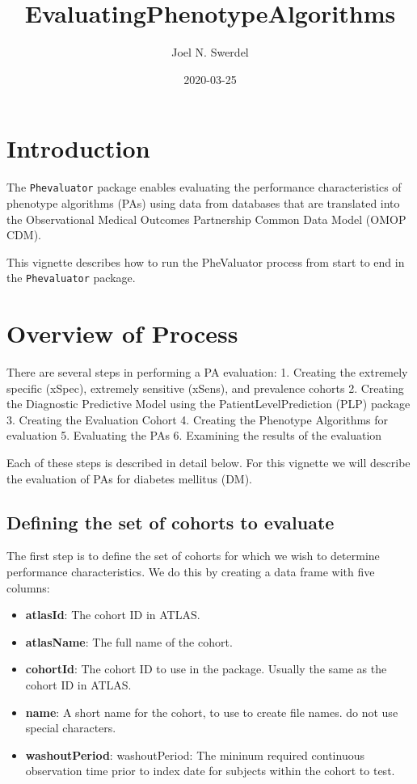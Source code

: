 \documentclass[
]{article}
\title{EvaluatingPhenotypeAlgorithms}
\author{Joel N. Swerdel}
\date{2020-03-25}
\providecommand{\tightlist}{%
  \setlength{\itemsep}{0pt}\setlength{\parskip}{0pt}}
\begin{document}
\maketitle

{
\setcounter{tocdepth}{3}
\tableofcontents
}
\newpage

\hypertarget{introduction}{%
\section{Introduction}\label{introduction}}

The \texttt{Phevaluator} package enables evaluating the performance
characteristics of phenotype algorithms (PAs) using data from databases
that are translated into the Observational Medical Outcomes Partnership
Common Data Model (OMOP CDM).

This vignette describes how to run the PheValuator process from start to
end in the \texttt{Phevaluator} package.

\hypertarget{overview-of-process}{%
\section{Overview of Process}\label{overview-of-process}}

There are several steps in performing a PA evaluation: 1. Creating the
extremely specific (xSpec), extremely sensitive (xSens), and prevalence
cohorts 2. Creating the Diagnostic Predictive Model using the
PatientLevelPrediction (PLP) package 3. Creating the Evaluation Cohort
4. Creating the Phenotype Algorithms for evaluation 5. Evaluating the
PAs 6. Examining the results of the evaluation

Each of these steps is described in detail below. For this vignette we
will describe the evaluation of PAs for diabetes mellitus (DM).

\hypertarget{defining-the-set-of-cohorts-to-evaluate}{%
\subsection{Defining the set of cohorts to
evaluate}\label{defining-the-set-of-cohorts-to-evaluate}}

The first step is to define the set of cohorts for which we wish to
determine performance characteristics. We do this by creating a data
frame with five columns:

\begin{itemize}
\tightlist
\item
  \textbf{atlasId}: The cohort ID in ATLAS.
\item
  \textbf{atlasName}: The full name of the cohort.
\item
  \textbf{cohortId}: The cohort ID to use in the package. Usually the
  same as the cohort ID in ATLAS.
\item
  \textbf{name}: A short name for the cohort, to use to create file
  names. do not use special characters.
\item
  \textbf{washoutPeriod}: washoutPeriod: The mininum required continuous
  observation time prior to index date for subjects within the cohort to
  test.
\end{itemize}
\end{document}
